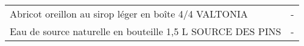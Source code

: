 \begin{longtable}{p{5cm}p{10cm}}
                                                    Abricot oreillon au sirop léger en boîte 4/4 VALTONIA &                                                                                                                                                                                                                                                                                                                                                                                                                                                                                                                                                                                                                                                                                                                                                                                                                                                                                                                                                                                                                                        - \\
                                               Eau de source naturelle en bouteille 1,5 L SOURCE DES PINS &                                                                                                                                                                                                                                                                                                                                                                                                                                                                                                                                                                                                                                                                                                                                                                                                                                                                                                                                                                                                                                        - \\

\end{longtable}
